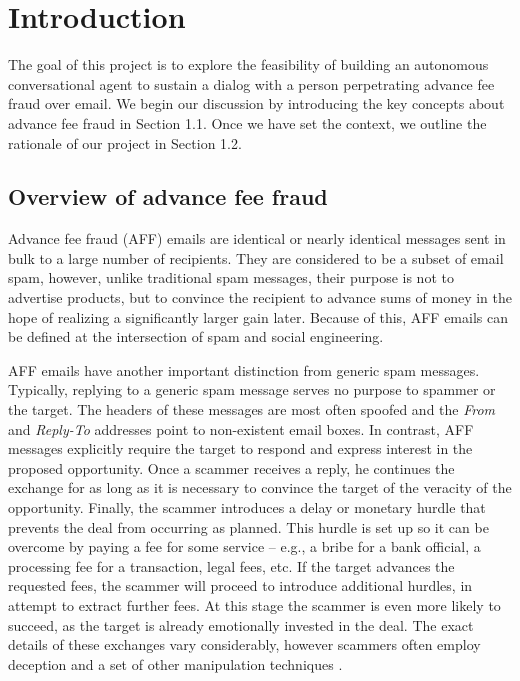\chapter{Introduction}
The goal of this project is to explore the feasibility of building an autonomous conversational agent to sustain a dialog with a person perpetrating advance fee fraud over email. We begin our discussion by introducing the key concepts about advance fee fraud in Section 1.1. Once we have set the context, we outline the rationale of our project in Section 1.2.

\section{Overview of advance fee fraud}
Advance fee fraud (AFF) emails are identical or nearly identical messages sent in bulk to a large number of recipients. They are considered to be a subset of email spam, however, unlike traditional spam messages, their purpose is not to advertise products, but to convince the recipient to advance sums of money in the hope of realizing a significantly larger gain later. Because of this, AFF emails can be defined at the intersection of spam and social engineering.

AFF emails have another important distinction from generic spam messages. Typically, replying to a generic spam message serves no purpose to spammer or the target. The headers of these messages are most often spoofed and the \emph{From} and \emph{Reply-To} addresses point to non-existent email boxes. In contrast, AFF messages explicitly require the target to respond and express interest in the proposed opportunity. Once a scammer receives a reply, he continues the exchange for as long as it is necessary to convince the target of the veracity of the opportunity. Finally, the scammer introduces a delay or monetary hurdle that prevents the deal from occurring as planned. This hurdle is set up so it can be overcome by paying a fee for some service -- e.g., a bribe for a bank official, a processing fee for a transaction, legal fees, etc. If the target advances the requested fees, the scammer will proceed to introduce additional hurdles, in attempt to extract further fees. At this stage the scammer is even more likely to succeed, as the target is already emotionally invested in the deal. The exact details of these exchanges vary considerably, however scammers often employ deception and a set of other manipulation techniques \cite{P1}.

